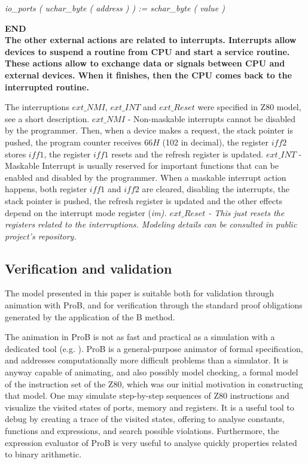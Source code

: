 \documentclass[a4paper]{llncs}
\begin{document}
\hspace*{0.20in}\it io\_ports \rm ( \it uchar\_byte \rm ( \it address \rm ) \rm ) \rm := \it schar\_byte \rm ( \it
value \rm )

\hspace*{0.00in}\bf END\rm
\\

The other external actions are related to interrupts. Interrupts allow
devices to suspend a routine from CPU and start a service routine.
These actions allow to exchange data or signals between CPU and external
devices. When it finishes, then the CPU comes back to the interrupted
routine. 

The interruptions  $ext\_NMI$, $ext\_INT$ and $ext\_Reset$
were specified in Z80 model, see a short description.  $ext\_NMI$ - Non-maskable interrupts cannot be disabled
by the programmer. Then, when a device makes a request, the stack pointer is pushed,
the program counter receives $66H$ (102 in decimal), the register $\textit{iff2}$ stores
$\textit{iff1}$, the register $\textit{iff1}$ resets and the refresh register is updated.
$ext\_INT$ - Maskable Interrupt is usually reserved for important functions
that can be enabled and disabled by the programmer. When a maskable interrupt
action happens, both register $\textit{iff1}$ and $\textit{iff2}$ are cleared,
disabling the interrupts, the stack pointer is pushed, the refresh register is updated and
the other effects depend on the interrupt mode register (\it im\rm).
$ext\_Reset$  - This just resets the registers related to the interruptions. Modeling details can be consulted in public project's repository.


\subsection{Verification and validation}

The model presented in this paper is suitable both for validation
through animation with ProB, and for verification through the standard
proof obligations generated by the application of the B method.

The animation in ProB is not as fast and practical as a simulation
with a dedicated tool (e.g. \cite{Simulator_z80}). ProB is a
general-purpose animator of formal specification, and addresses
computationally more difficult problems than a simulator. It is anyway
capable of animating, and also possibly model checking, a formal model
of the instruction set of the Z80, which was our initial motivation in
constructing that model. One may simulate step-by-step sequences of
Z80 instructions and visualize the visited states of ports, memory and
registers. It is a useful tool to debug by creating a trace of the
visited states, offering to analyse constants, functions and
expressions, and search possible violations. Furthermore, the expression
evaluator of ProB is very useful to analyse quickly properties related to binary arithmetic.
\end{document}
